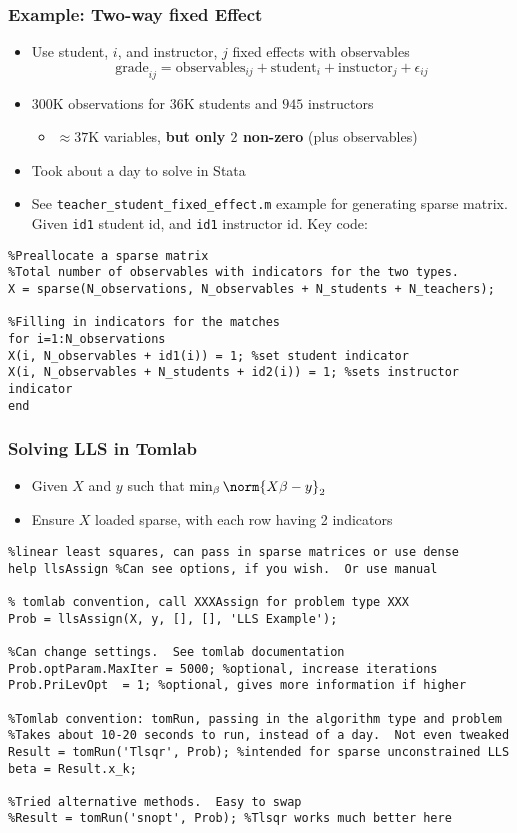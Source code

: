 \documentclass[nofootline]{etk-presentation}
\begin{document}
\begin{frame}[fragile]	\frametitle{Example: Two-way fixed Effect}
	\begin{itemize}
		\item 	Use student, $i$, and instructor, $j$ fixed effects with observables
			$$
		\text{grade}_{ij} = \text{observables}_{ij} + \text{student}_i + \text{instuctor}_j + \epsilon_{ij}
		$$
		\item $300$K observations for $36$K students and $945$ instructors
		\begin{itemize}
			\item $\approx 37$K variables, \textbf{but only $2$ non-zero} (plus observables)
		\end{itemize}
		\item Took about a day to solve in Stata
		\item See \verb!teacher_student_fixed_effect.m! example for generating sparse matrix.  Given \verb!id1! student id, and \verb!id1! instructor id.  Key code:
	\end{itemize}
\begin{verbatim}
%Preallocate a sparse matrix
%Total number of observables with indicators for the two types.
X = sparse(N_observations, N_observables + N_students + N_teachers); 

%Filling in indicators for the matches
for i=1:N_observations
X(i, N_observables + id1(i)) = 1; %set student indicator
X(i, N_observables + N_students + id2(i)) = 1; %sets instructor indicator
end
\end{verbatim}
\end{frame}

\begin{frame}[fragile]	\frametitle{Solving LLS in Tomlab}
	\begin{itemize}
		\item Given $X$ and $y$ such that $\min_\beta\norm{X \beta - y}_2$
		\item Ensure $X$ loaded sparse, with each row having 2 indicators
	\end{itemize}
\begin{verbatim}
%linear least squares, can pass in sparse matrices or use dense
help llsAssign %Can see options, if you wish.  Or use manual

% tomlab convention, call XXXAssign for problem type XXX
Prob = llsAssign(X, y, [], [], 'LLS Example'); 

%Can change settings.  See tomlab documentation
Prob.optParam.MaxIter = 5000; %optional, increase iterations
Prob.PriLevOpt  = 1; %optional, gives more information if higher

%Tomlab convention: tomRun, passing in the algorithm type and problem
%Takes about 10-20 seconds to run, instead of a day.  Not even tweaked
Result = tomRun('Tlsqr', Prob); %intended for sparse unconstrained LLS
beta = Result.x_k;

%Tried alternative methods.  Easy to swap
%Result = tomRun('snopt', Prob); %Tlsqr works much better here
\end{verbatim}

\end{frame}
	
\end{document}
